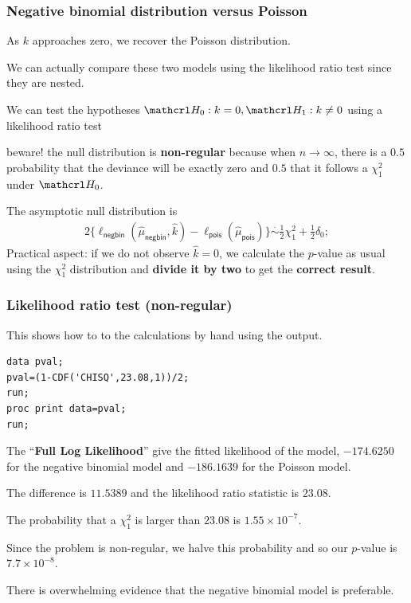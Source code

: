 \documentclass{beamer}
\begin{document}
\begin{frame}[fragile]
\frametitle{Negative binomial distribution versus Poisson}
\bi

\item As $k$ approaches zero, we recover the
Poisson distribution. 
\item We can actually compare these two models using the likelihood ratio test since they are nested. 
\item  We can test the hypotheses $\Hy_0: k=0, \Hy_1: k\neq 0$ using a likelihood ratio test
\bi \item beware! the null distribution is \textbf{non-regular} because when $n \to \infty$, there is a $0.5$ probability that the deviance will be exactly zero and $0.5$ that it follows a $\chi^2_1$ under $\Hy_0$.
\ei
\item The asymptotic null distribution is 
\begin{align*}
2\{\ell_{\mathsf{negbin}}(\hat{\mu}_{\mathsf{negbin}}, \hat{k}) - \ell_{\mathsf{pois}}(\hat{\mu}_{\mathsf{pois}})\} \stackrel{\cdot}{\sim} \frac{1}{2}\chi^2_1 + \frac{1}{2} \delta_0;
\end{align*}
Practical aspect: if we do not observe $\hat{k}=0$, we calculate the $p$-value as usual using the $\chi^2_1$ distribution and \textbf{divide it by two} to get the \textbf{correct result}.
\ei
\end{frame}
\begin{frame}[fragile]
\frametitle{Likelihood ratio test (non-regular)}
This shows how to to the calculations by hand using the output.

\begin{tcolorbox}[colback=white, colframe=hecblue, title=SAS code for likelihood ratio test (non-regular)]
{\small 
\begin{verbatim}
data pval;
pval=(1-CDF('CHISQ',23.08,1))/2;
run;
proc print data=pval;
run;
\end{verbatim}
}
\end{tcolorbox}

\end{frame}
\begin{frame}
\bi \item The ``\textbf{Full Log Likelihood}'' give the fitted likelihood of the model, $-174.6250$ for the negative binomial model and $-186.1639$ for the Poisson model.
\item The difference is $11.5389$ and the likelihood ratio statistic is $23.08$.
\item The probability that a  $\chi^2_1$ is larger than $23.08$ is $1.55 \times 10^{-7}$.
\item Since the problem is non-regular, we halve this probability and so our $p$-value is $7.7 \times 10^{-8}$. 
\item There is overwhelming evidence that the negative binomial model is preferable.
\ei
\end{frame}
\end{document}
